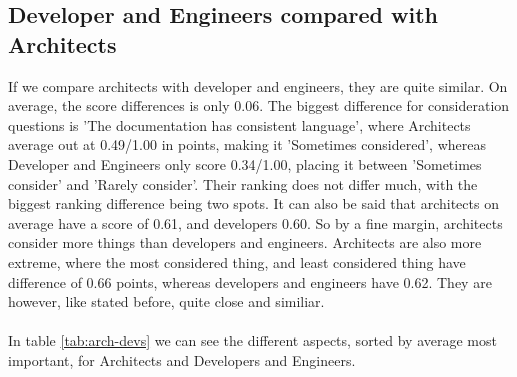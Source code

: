 \documentclass{cslthse-msc}
\begin{document}
    \subsection{Developer and Engineers compared with Architects}
    If we compare architects with developer and engineers, they
    are quite similar. On average, the score differences is only 0.06. The
    biggest difference for consideration questions is 'The documentation has
    consistent language', where Architects average out at 0.49/1.00 in
    points, making it 'Sometimes considered', whereas Developer and
    Engineers only score 0.34/1.00, placing it between 'Sometimes consider'
    and 'Rarely consider'. Their ranking does not differ much, with the
    biggest ranking difference being two spots.
    It can also be said that architects on average have a score of 0.61, and developers 0.60. So by a fine margin, architects consider more things than developers and engineers. Architects are also more extreme, where the most considered thing, and least considered thing have difference of 0.66 points, whereas developers and engineers have 0.62. They are however, like stated before, quite close and similiar.
    \\ \\
    In table \ref{tab:arch-devs} we can see the different aspects, sorted by average most
    important, for Architects and Developers and Engineers.
\end{document}
